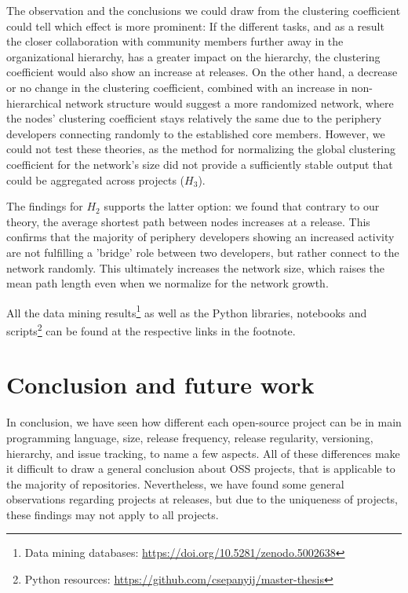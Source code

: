 The observation and the conclusions we could draw from the clustering coefficient could tell which effect is more prominent: If the different tasks, and as a result the closer collaboration with community members further away in the organizational hierarchy, has a greater impact on the hierarchy, the clustering coefficient would also show an increase at releases. On the other hand, a decrease or no change in the clustering coefficient, combined with an increase in non-hierarchical network structure would suggest a more randomized network, where the nodes' clustering coefficient stays relatively the same due to the periphery developers connecting randomly to the established core members. However, we could not test these theories, as the method for normalizing the global clustering coefficient for the network's size did not provide a sufficiently stable output that could be aggregated across projects ($H_3$). 

The findings for $H_2$ supports the latter option: we found that contrary to our theory, the average shortest path between nodes increases at a release. This confirms that the majority of periphery developers showing an increased activity are not fulfilling a 'bridge' role between two developers, but rather connect to the network randomly. This ultimately increases the network size, which raises the mean path length even when we normalize for the network growth.

All the data mining results\footnote{Data mining databases: \url{https://doi.org/10.5281/zenodo.5002638}} as well as the Python libraries, notebooks and scripts\footnote{Python resources: \url{https://github.com/csepanyij/master-thesis}} can be found at the respective links in the footnote.

\section{Conclusion and future work}

In conclusion, we have seen how different each open-source project can be in main programming language, size, release frequency, release regularity, versioning, hierarchy, and issue tracking, to name a few aspects. All of these differences make it difficult to draw a general conclusion about OSS projects, that is applicable to the majority of repositories. Nevertheless, we have found some general observations regarding projects at releases, but due to the uniqueness of projects, these findings may not apply to all projects.

